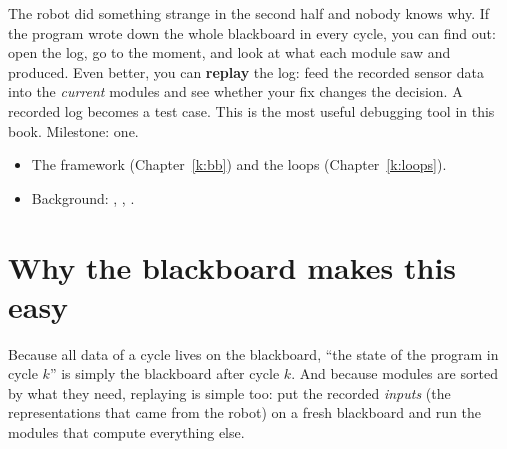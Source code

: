 \label{k:log}

The robot did something strange in the second half and nobody knows why. If the program wrote down the whole blackboard in every cycle, you can find out: open the log, go to the moment, and look at what each module saw and produced. Even better, you can \textbf{replay} the log: feed the recorded sensor data into the \emph{current} modules and see whether your fix changes the decision. A recorded log becomes a test case. This is the most useful debugging tool in this book. Milestone: one.

\begin{needbox}
\begin{itemize}[nosep]
  \item The framework (Chapter~\ref{k:bb}) and the loops (Chapter~\ref{k:loops}).
  \item Background: , , .
\end{itemize}
\end{needbox}

\section*{Why the blackboard makes this easy}
Because all data of a cycle lives on the blackboard, ``the state of the program in cycle $k$'' is simply the blackboard after cycle $k$. And because modules are sorted by what they need, replaying is simple too: put the recorded \emph{inputs} (the representations that came from the robot) on a fresh blackboard and run the modules that compute everything else.

